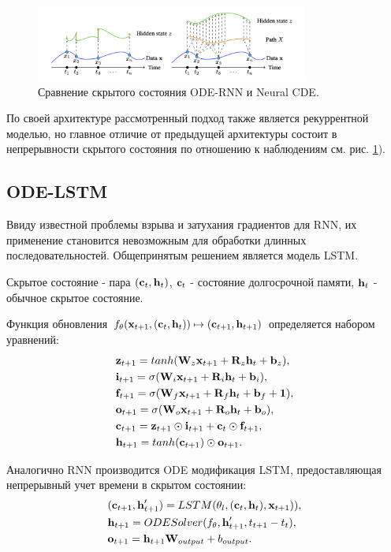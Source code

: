 \begin{figure}[!h]
	\centering
	\includegraphics[width=0.8\textwidth]{chapters/varenik1/images/neural-cde.png}
	\caption{Сравнение скрытого состояния ODE-RNN и Neural CDE.}
	\label{fig:im2}
\end{figure}

По своей архитектуре рассмотренный подход также является рекуррентной моделью, но главное отличие от предыдущей архитектуры состоит в непрерывности скрытого состояния по отношению к наблюдениям см. рис. \ref{fig:im2}).

\subsection{ODE-LSTM}

Ввиду известной проблемы взрыва и затухания градиентов для RNN, их применение становится невозможным для обработки длинных последовательностей. Общепринятым решением является модель LSTM. 

Скрытое состояние - пара $(\textbf{c}_t, \textbf{h}_t)$, $\textbf{c}_t$ - состояние долгосрочной памяти, $\textbf{h}_t$ - обычное скрытое состояние.

Функция обновления $f_{\theta}(\textbf{x}_{t+1}, (\textbf{c}_t, \textbf{h}_t)) \mapsto (\textbf{c}_{t+1}, \textbf{h}_{t+1})$ определяется набором уравнений:
\begin{align*}
    & \textbf{z}_{t+1} = tanh(\textbf{W}_z \textbf{x}_{t+1} + \textbf{R}_z\textbf{h}_t+\textbf{b}_z),\\
    & \textbf{i}_{t+1} = \sigma(\textbf{W}_i\textbf{x}_{t+1} + \textbf{R}_i \textbf{h}_t + \textbf{b}_i),\\
    & \textbf{f}_{t+1} = \sigma(\textbf{W}_f\textbf{x}_{t+1} + \textbf{R}_f \textbf{h}_t + \textbf{b}_f + \textbf{1}),\\
    & \textbf{o}_{t+1} = \sigma(\textbf{W}_o\textbf{x}_{t+1} + \textbf{R}_o \textbf{h}_t + \textbf{b}_o),\\
    & \textbf{c}_{t+1} = \textbf{z}_{t+1}\odot \textbf{i}_{t+1} + \textbf{c}_t\odot \textbf{f}_{t+1},\\
    & \textbf{h}_{t+1} = tanh(\textbf{c}_{t+1})\odot \textbf{o}_{t+1}.
\end{align*}

Аналогично RNN производится ODE модификация LSTM, предоставляющая непрерывный учет времени в скрытом состоянии:
\begin{align*}
    & (\textbf{c}_{t+1}, \textbf{h}_{t+1}') = LSTM(\theta_l, (\textbf{c}_t, \textbf{h}_t), \textbf{x}_{t+1})),\\
    & \textbf{h}_{t+1} = ODESolver(f_{\theta}, \textbf{h}_{t+1}', t_{t+1} - t_{t}),\\
    & \textbf{o}_{t+1} = \textbf{h}_{t+1}\textbf{W}_{output} + b_{output}.
\end{align*}

